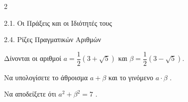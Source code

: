 
\begin{ylh}{2}
    \item 2.1. Οι Πράξεις και οι Ιδιότητές τους
    \item 2.4. Ρίζες Πραγματικών Αριθμών
\end{ylh}
Δίνονται οι αριθμοί $a = \dfrac{1}{2}(3+\sqrt{5})$ και $\beta = \dfrac{1}{2}(3-\sqrt{5})$.
\begin{alist}
\item Να υπολογίσετε το άθροισμα $a+\beta$ και το γινόμενο $a \cdot \beta$ .
\item Να αποδείξετε ότι $a^2 + \beta^2 = 7$ .
\end{alist}

